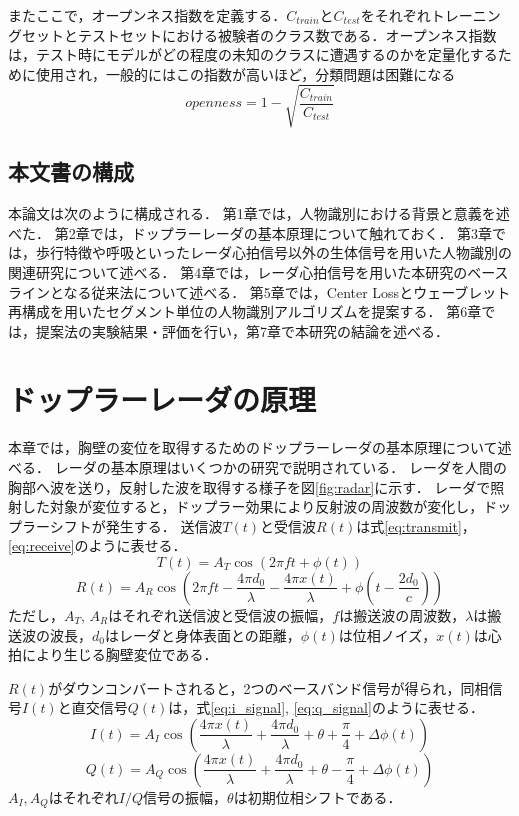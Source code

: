 またここで，オープンネス指数を定義する．$C_{train}$と$C_{test}$をそれぞれトレーニングセットとテストセットにおける被験者のクラス数である．オープンネス指数は，テスト時にモデルがどの程度の未知のクラスに遭遇するのかを定量化するために使用され，一般的にはこの指数が高いほど，分類問題は困難になる\cite{paper:HeartSignature}
\begin{equation}\label{}
  openness = 1 - \sqrt{\frac{C_{train}}{C_{test}}}
\end{equation}

\section{本文書の構成}
本論文は次のように構成される．
第1章では，人物識別における背景と意義を述べた．
第2章では，ドップラーレーダの基本原理について触れておく．
第3章では，歩行特徴や呼吸といったレーダ心拍信号以外の生体信号を用いた人物識別の関連研究について述べる．
第4章では，レーダ心拍信号を用いた本研究のベースラインとなる従来法について述べる．
第5章では，Center Lossとウェーブレット再構成を用いたセグメント単位の人物識別アルゴリズムを提案する．
第6章では，提案法の実験結果・評価を行い，第7章で本研究の結論を述べる．


\chapter{ドップラーレーダの原理}
本章では，胸壁の変位を取得するためのドップラーレーダの基本原理について述べる．
レーダの基本原理はいくつかの研究で説明されている．
レーダを人間の胸部へ波を送り，反射した波を取得する様子を図\ref{fig:radar}に示す．
レーダで照射した対象が変位すると，ドップラー効果により反射波の周波数が変化し，ドップラーシフトが発生する．
送信波$T(t)$と受信波$R(t)$は式\ref{eq:transmit}，\ref{eq:receive}のように表せる．
\begin{equation}\label{eq:transmit}
  T(t) = A_{T} \cos (2\pi ft + \phi (t))
\end{equation}
\begin{equation}\label{eq:receive}
  R(t) = A_{R} \cos (2\pi ft - \frac{4\pi d_0}{\lambda} - \frac{4\pi x(t)}{\lambda} + \phi (t-\frac{2d_0}{c}))
\end{equation}
ただし，$A_T$, $A_R$はそれぞれ送信波と受信波の振幅，$f$は搬送波の周波数，$\lambda$は搬送波の波長，$d_0$はレーダと身体表面との距離，$\phi (t)$は位相ノイズ，$x(t)$は心拍により生じる胸壁変位である．

$R(t)$がダウンコンバートされると，2つのベースバンド信号が得られ，同相信号$I(t)$と直交信号$Q(t)$は，式\ref{eq:i_signal}, \ref{eq:q_signal}のように表せる．
\begin{equation}\label{eq:i_signal}
  I(t) = A_{I} \cos (\frac{4\pi x(t)}{\lambda} + \frac{4\pi d_0}{\lambda} + \theta + \frac{\pi}{4} + \Delta \phi (t))
\end{equation}
\begin{equation}\label{eq:q_signal}
  Q(t) = A_Q \cos (\frac{4\pi x(t)}{\lambda} + \frac{4\pi d_0}{\lambda} + \theta - \frac{\pi}{4} + \Delta \phi (t))
\end{equation}
$A_I, A_Q$はそれぞれ$I/Q$信号の振幅，$\theta$は初期位相シフトである．

